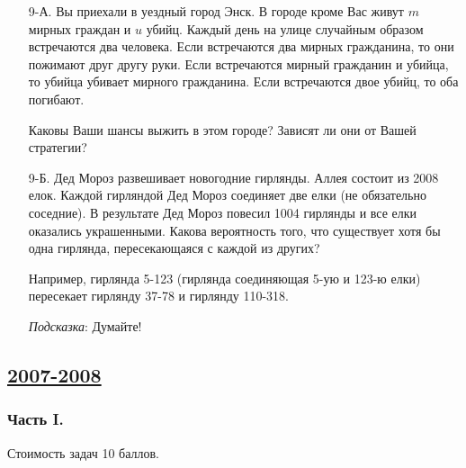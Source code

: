 \begin{enumerate}
\item[9-А.] Вы приехали в уездный город Энск. В городе кроме Вас живут $m$ мирных
граждан и $u$ убийц. Каждый день на улице случайным образом встречаются два человека.
Если встречаются два мирных гражданина, то они пожимают друг другу руки. Если
встречаются мирный гражданин и убийца, то убийца убивает мирного гражданина. Если
встречаются двое убийц, то оба погибают.

Каковы Ваши шансы выжить в этом городе? Зависят ли они от Вашей стратегии?

\item[9-Б.] Дед Мороз развешивает новогодние гирлянды. Аллея состоит из 2008 елок.
Каждой гирляндой Дед Мороз соединяет две елки (не обязательно соседние). В результате
Дед Мороз повесил 1004 гирлянды и все елки оказались украшенными. Какова вероятность
того, что существует хотя бы одна гирлянда, пересекающаяся с каждой из других?

Например, гирлянда 5-123 (гирлянда соединяющая 5-ую и 123-ю елки) пересекает гирлянду
37-78 и гирлянду 110-318.

\emph{Подсказка}: Думайте!
\end{enumerate}




\newpage
\subsection[2007-2008]{\hyperref[sec:sol_kr_02_2007_2008]{2007-2008}}
\label{sec:kr_02_2007_2008}

\subsubsection*{Часть I.}

Стоимость задач 10 баллов.


